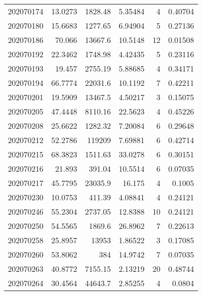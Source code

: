 \begin{tabular}{rrrrrr}
 202070174 &         13.0273  &     1828.48   &            5.35484 &           4 & 0.40704 \\
 202070180 &         15.6683  &     1277.65   &            6.94904 &           5 & 0.27136 \\
 202070186 &         70.066   &    13667.6    &           10.5148  &          12 & 0.01508 \\
 202070192 &         22.3462  &     1748.98   &            4.42435 &           5 & 0.23116 \\
 202070193 &         19.457   &     2755.19   &            5.88685 &           4 & 0.34171 \\
 202070194 &         66.7774  &    22031.6    &           10.1192  &           7 & 0.42211 \\
 202070201 &         19.5909  &    13467.5    &            4.50217 &           3 & 0.15075 \\
 202070205 &         47.4448  &     8110.16   &           22.5623  &           4 & 0.45226 \\
 202070208 &         25.6622  &     1282.32   &            7.20084 &           6 & 0.29648 \\
 202070212 &         52.2786  &   119209      &            7.69881 &           6 & 0.42714 \\
 202070215 &         68.3823  &     1511.63   &           33.0278  &           6 & 0.30151 \\
 202070216 &         21.893   &      391.04   &           10.5514  &           6 & 0.07035 \\
 202070217 &         45.7795  &    23035.9    &           16.175   &           4 & 0.1005  \\
 202070230 &         10.0753  &      411.39   &            4.08841 &           4 & 0.24121 \\
 202070246 &         55.2304  &     2737.05   &           12.8388  &          10 & 0.24121 \\
 202070250 &         54.5565  &     1869.6    &           26.8962  &           7 & 0.22613 \\
 202070258 &         25.8957  &    13953      &            1.86522 &           3 & 0.17085 \\
 202070260 &         53.8062  &      384      &           14.9742  &           7 & 0.07035 \\
 202070263 &         40.8772  &     7155.15   &            2.13219 &          20 & 0.48744 \\
 202070264 &         30.4564  &    44643.7    &            2.85255 &           4 & 0.0804  \\

\end{tabular}
